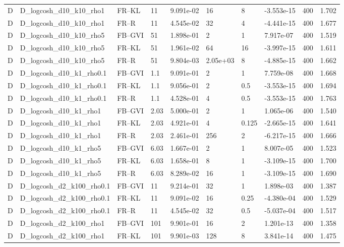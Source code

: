 \begin{tabular}{llllllllll}
D & D\_logcosh\_d10\_k10\_rho1 & FR--KL & 11 & 9.091e-02 & 16 & 8 & -3.553e-15 & 400 & 1.702 \\
D & D\_logcosh\_d10\_k10\_rho1 & FR--R & 11 & 4.545e-02 & 32 & 4 & -4.441e-15 & 400 & 1.677 \\
D & D\_logcosh\_d10\_k10\_rho5 & FB--GVI & 51 & 1.898e-01 & 2 & 1 & 7.917e-07 & 400 & 1.519 \\
D & D\_logcosh\_d10\_k10\_rho5 & FR--KL & 51 & 1.961e-02 & 64 & 16 & -3.997e-15 & 400 & 1.611 \\
D & D\_logcosh\_d10\_k10\_rho5 & FR--R & 51 & 9.804e-03 & 2.05e+03 & 8 & -4.885e-15 & 400 & 1.662 \\
D & D\_logcosh\_d10\_k1\_rho0.1 & FB--GVI & 1.1 & 9.091e-01 & 2 & 1 & 7.759e-08 & 400 & 1.668 \\
D & D\_logcosh\_d10\_k1\_rho0.1 & FR--KL & 1.1 & 9.056e-01 & 2 & 0.5 & -3.553e-15 & 400 & 1.694 \\
D & D\_logcosh\_d10\_k1\_rho0.1 & FR--R & 1.1 & 4.528e-01 & 4 & 0.5 & -3.553e-15 & 400 & 1.763 \\
D & D\_logcosh\_d10\_k1\_rho1 & FB--GVI & 2.03 & 5.000e-01 & 2 & 1 & 1.065e-06 & 400 & 1.540 \\
D & D\_logcosh\_d10\_k1\_rho1 & FR--KL & 2.03 & 4.921e-01 & 4 & 0.125 & -2.665e-15 & 400 & 1.641 \\
D & D\_logcosh\_d10\_k1\_rho1 & FR--R & 2.03 & 2.461e-01 & 256 & 2 & -6.217e-15 & 400 & 1.666 \\
D & D\_logcosh\_d10\_k1\_rho5 & FB--GVI & 6.03 & 1.667e-01 & 2 & 1 & 8.007e-05 & 400 & 1.523 \\
D & D\_logcosh\_d10\_k1\_rho5 & FR--KL & 6.03 & 1.658e-01 & 8 & 1 & -3.109e-15 & 400 & 1.700 \\
D & D\_logcosh\_d10\_k1\_rho5 & FR--R & 6.03 & 8.289e-02 & 16 & 1 & -3.109e-15 & 400 & 1.690 \\
D & D\_logcosh\_d2\_k100\_rho0.1 & FB--GVI & 11 & 9.214e-01 & 32 & 1 & 1.898e-03 & 400 & 1.387 \\
D & D\_logcosh\_d2\_k100\_rho0.1 & FR--KL & 11 & 9.091e-02 & 16 & 0.25 & -4.380e-04 & 400 & 1.529 \\
D & D\_logcosh\_d2\_k100\_rho0.1 & FR--R & 11 & 4.545e-02 & 32 & 0.5 & -5.037e-04 & 400 & 1.517 \\
D & D\_logcosh\_d2\_k100\_rho1 & FB--GVI & 101 & 9.901e-01 & 16 & 2 & 1.201e-13 & 400 & 1.358 \\
D & D\_logcosh\_d2\_k100\_rho1 & FR--KL & 101 & 9.901e-03 & 128 & 8 & 3.841e-14 & 400 & 1.475 \\

\end{tabular}
